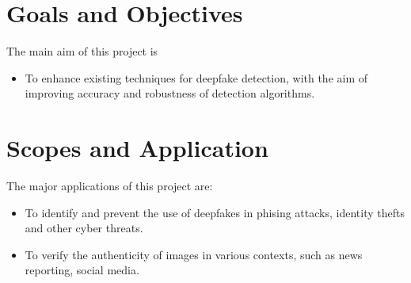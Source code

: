     \pagebreak
    \section{Goals and Objectives}
        The main aim of this project is 
        \begin{itemize}
            \item To enhance existing techniques for deepfake detection, with the aim of improving accuracy and robustness of detection algorithms.
        \end{itemize}
    
    \section{Scopes and Application}
        The major applications of this project are:
        \begin{itemize}
            \item To identify and prevent the use of deepfakes in phising attacks, identity thefts and other cyber threats.
            \item To verify the authenticity of images in various contexts, such as news reporting, social media.  
        \end{itemize}
    